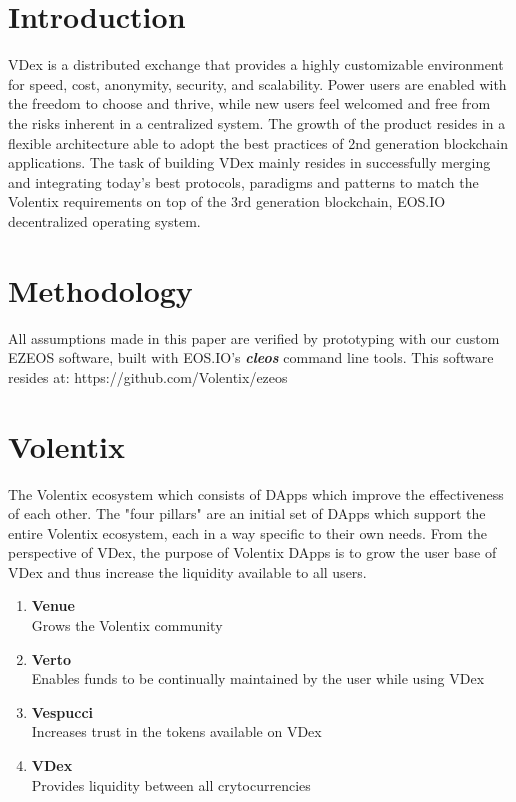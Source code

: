 \documentclass[]{article}
\begin{document}
\section{Introduction}

VDex is a distributed exchange that provides a highly customizable environment for speed, cost, anonymity, security, and scalability. 
Power users are enabled with the freedom to choose and thrive, 
while new users feel welcomed and free from the risks inherent in a centralized system. 
The growth of the product resides in a flexible architecture 
able to adopt the best practices of 2nd generation blockchain applications.  
The task of building VDex mainly resides in successfully merging
and integrating today's best protocols, paradigms and patterns to match the 
Volentix requirements on top of the 3rd generation blockchain, EOS.IO decentralized operating system.

 	
\section{Methodology}

All assumptions made in this paper are verified by prototyping with our custom EZEOS software, built
with EOS.IO's \textbf{\textit{cleos}} command line tools. This software resides at: https://github.com/Volentix/ezeos

\section{Volentix}	
The Volentix ecosystem which consists of DApps which improve the effectiveness of each other.
The "four pillars" are an initial set of DApps which support the entire Volentix ecosystem,
each in a way specific to their own needs.
From the perspective of VDex, the purpose of Volentix DApps is to grow the user base of VDex
and thus increase the liquidity available to all users.\\
\begin{enumerate}
\item \textbf{Venue}\\ Grows the Volentix community
\item \textbf{Verto}\\ Enables funds to be continually maintained by the user while using VDex
\item \textbf{Vespucci}\\ Increases trust in the tokens available on VDex
\item \textbf{VDex}\\ Provides liquidity between all crytocurrencies
\end{enumerate}
\end{document}
